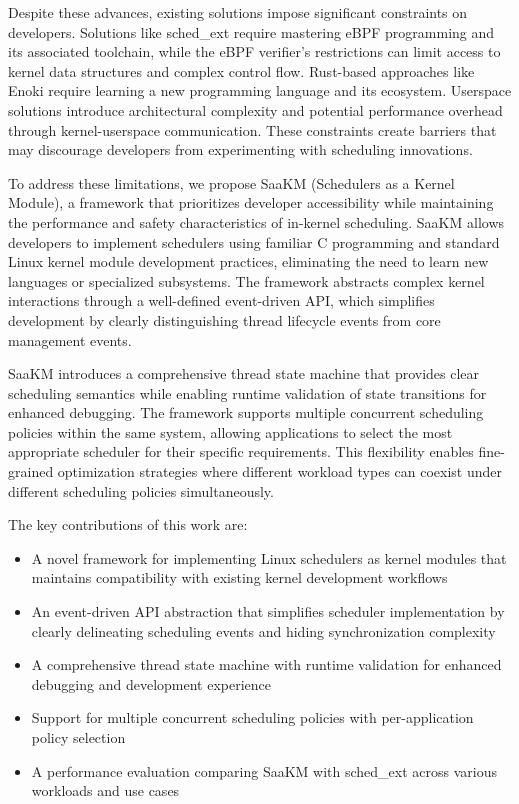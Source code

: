 \parspace
Despite these advances, existing solutions impose significant constraints on developers. Solutions like sched\_ext require mastering eBPF programming and its associated toolchain, while the eBPF verifier's restrictions can limit access to kernel data structures and complex control flow. Rust-based approaches like Enoki require learning a new programming language and its ecosystem. Userspace solutions introduce architectural complexity and potential performance overhead through kernel-userspace communication. These constraints create barriers that may discourage developers from experimenting with scheduling innovations.

\parspace
To address these limitations, we propose SaaKM (Schedulers as a Kernel Module), a framework that prioritizes developer accessibility while maintaining the performance and safety characteristics of in-kernel scheduling. SaaKM allows developers to implement schedulers using familiar C programming and standard Linux kernel module development practices, eliminating the need to learn new languages or specialized subsystems. The framework abstracts complex kernel interactions through a well-defined event-driven API, which simplifies development by clearly distinguishing thread lifecycle events from core management events.

\parspace
SaaKM introduces a comprehensive thread state machine that provides clear scheduling semantics while enabling runtime validation of state transitions for enhanced debugging. The framework supports multiple concurrent scheduling policies within the same system, allowing applications to select the most appropriate scheduler for their specific requirements. This flexibility enables fine-grained optimization strategies where different workload types can coexist under different scheduling policies simultaneously.

\parspace
The key contributions of this work are:

\begin{itemize}
\item A novel framework for implementing Linux schedulers as kernel modules that maintains compatibility with existing kernel development workflows
\item An event-driven API abstraction that simplifies scheduler implementation by clearly delineating scheduling events and hiding synchronization complexity
\item A comprehensive thread state machine with runtime validation for enhanced debugging and development experience  
\item Support for multiple concurrent scheduling policies with per-application policy selection
\item A performance evaluation comparing SaaKM with sched\_ext across various workloads and use cases
\end{itemize}

